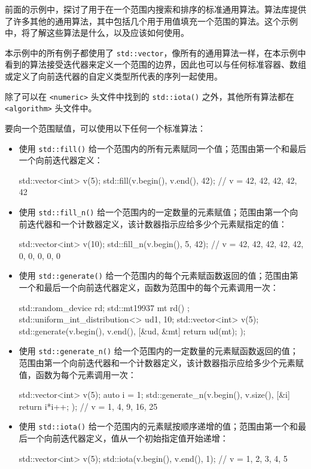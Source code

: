 前面的示例中，探讨了用于在一个范围内搜索和排序的标准通用算法。算法库提供了许多其他的通用算法，其中包括几个用于用值填充一个范围的算法。这个示例中，将了解这些算法是什么，以及应该如何使用。


本示例中的所有例子都使用了 \verb|std::vector|，像所有的通用算法一样，在本示例中看到的算法接受迭代器来定义一个范围的边界，因此也可以与任何标准容器、数组或定义了向前迭代器的自定义类型所代表的序列一起使用。

除了可以在 \verb|<numeric>| 头文件中找到的 \verb|std::iota()| 之外，其他所有算法都在 \verb|<algorithm>| 头文件中。


要向一个范围赋值，可以使用以下任何一个标准算法：

\begin{itemize}
\item
使用 \verb|std::fill()| 给一个范围内的所有元素赋同一个值；范围由第一个和最后一个向前迭代器定义：

\begin{cpp}
std::vector<int> v(5);
std::fill(v.begin(), v.end(), 42);
// v = {42, 42, 42, 42, 42}
\end{cpp}

\item
使用 \verb|std::fill_n()| 给一个范围内的一定数量的元素赋值；范围由第一个向前迭代器和一个计数器定义，该计数器指示应给多少个元素赋指定的值：

\begin{cpp}
std::vector<int> v(10);
std::fill_n(v.begin(), 5, 42);
// v = {42, 42, 42, 42, 42, 0, 0, 0, 0, 0}
\end{cpp}

\item
使用 \verb|std::generate()| 给一个范围内的每个元素赋函数返回的值；范围由第一个和最后一个向前迭代器定义，函数为范围中的每个元素调用一次：

\begin{cpp}
std::random_device rd{};
std::mt19937 mt{ rd() };
std::uniform_int_distribution<> ud{1, 10};
std::vector<int> v(5);
std::generate(v.begin(), v.end(),
              [&ud, &mt] {return ud(mt); });
\end{cpp}

\item
使用 \verb|std::generate_n()| 给一个范围内的一定数量的元素赋函数返回的值；范围由第一个向前迭代器和一个计数器定义，该计数器指示应给多少个元素赋值，函数为每个元素调用一次：

\begin{cpp}
std::vector<int> v(5);
auto i = 1;
std::generate_n(v.begin(), v.size(), [&i] { return i*i++; });
// v = {1, 4, 9, 16, 25}
\end{cpp}

\item
使用 \verb|std::iota()| 给一个范围内的元素赋按顺序递增的值；范围由第一个和最后一个向前迭代器定义，值从一个初始指定值开始递增：

\begin{cpp}
std::vector<int> v(5);
std::iota(v.begin(), v.end(), 1);
// v = {1, 2, 3, 4, 5}
\end{cpp}
\end{itemize}

